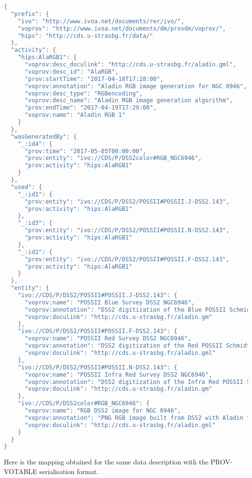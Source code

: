 \begin{lstlisting}[language=C, style=customc, caption=JSON serialisation example for a Color composition Activity]
{
  "prefix": {
    "ivo": "http://www.ivoa.net/documents/rer/ivo/",
    "voprov": "http://www.ivoa.net/documents/dm/provdm/voprov/",
    "hips": "http://cds.u-strasbg.fr/data/"
  },
  "activity": {
    "hips:AlaRGB1": {
      "voprov:desc_doculink": "http://cds.u-strasbg.fr/aladin.gml",
      "voprov:desc_id": "AlaRGB",
      "prov:startTime": "2017-04-18T17:28:00",
      "voprov:annotation": "Aladin RGB image generation for NGC 6946",
      "voprov:desc_type": "RGBencoding",
      "voprov:desc_name": "Aladin RGB image generation algorithm",
      "prov:endTime": "2017-04-19T17:29:00",
      "voprov:name": "Aladin RGB 1"
    }
  },
  "wasGeneratedBy": {
    "_:id4": {
      "prov:time": "2017-05-05T00:00:00",
      "prov:entity": "ivo://CDS/P/DSS2color#RGB_NGC6946",
      "prov:activity": "hips:AlaRGB1"
    }
  },
  "used": {
    "_:id1": {
      "prov:entity": "ivo://CDS/P/DSS2/POSSII#POSSII.J-DSS2.143",
      "prov:activity": "hips:AlaRGB1"
    },
    "_:id3": {
      "prov:entity": "ivo://CDS/P/DSS2/POSSII#POSSII.N-DSS2.143",
      "prov:activity": "hips:AlaRGB1"
    },
    "_:id2": {
      "prov:entity": "ivo://CDS/P/DSS2/POSSII#POSSII.F-DSS2.143",
      "prov:activity": "hips:AlaRGB1"
    }
  },
  "entity": {
    "ivo://CDS/P/DSS2/POSSII#POSSII.J-DSS2.143": {
      "voprov:name": "POSSII Blue Survey DSS2 NGC6946",
      "voprov:annotation": "DSS2 digitization of the Blue POSSII Schmidt survey around  NGC 6946",
      "voprov:doculink": "http://cds.u-strasbg.fr/aladin.gm"
    },
    "ivo://CDS/P/DSS2/POSSII#POSSII.F-DSS2.143": {
      "voprov:name": "POSSII Red Survey DSS2 NGC6946",
      "voprov:annotation": "DSS2 digitization of the Red POSSII Schmidt survey around NGC 6946",
      "voprov:doculink": "http://cds.u-strasbg.fr/aladin.gml"
    },
    "ivo://CDS/P/DSS2/POSSII#POSSII.N-DSS2.143": {
      "voprov:name": "POSSII Infra Red Survey DSS2 NGC6946",
      "voprov:annotation": "DSS2 digitization of the Infra Red POSSII Schmidt survey around NGC 6946",
      "voprov:doculink": "http://cds.u-strasbg.fr/aladin.gm"
    },
    "ivo://CDS/P/DSS2color#RGB_NGC6946": {
      "voprov:name": "RGB DSS2 image for NGC 6946",
      "voprov:annotation": "PNG RGB image built from DSS2 with Aladin for galaxy NGC 6946",
      "voprov:doculink": "http://cds.u-strasbg.fr/aladin.gml"
    }
  }
}
\end{lstlisting}

Here is the mapping obtained for the same data description with the PROV-VOTABLE serialisation format.


